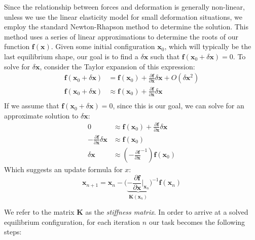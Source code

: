 Since the relationship between forces and deformation is generally
non-linear, unless we use the linear elasticity model for small
deformation situations, we employ the standard Newton-Rhapson method
to determine the solution. This method uses a series of linear
approximations to determine the roots of our function $\mathbf
f(\mathbf x)$. Given some initial configuration
$\mathbf x_0$, which will typically be the last equilibrium shape, our
goal is to find a $\delta \mathbf x$ such that $\mathbf f(\mathbf x_0 + \delta \mathbf
x) = 0$. To solve for $\delta \mathbf x$, consider the Taylor
expansion of this expression:
\begin{equation}
  \label{equ:newtontaylor}
  \begin{split}
    \mathbf f(\mathbf x_0 + \delta \mathbf x) &= \mathbf f(\mathbf x_0) + \frac{ \partial \mathbf f }{\partial \mathbf x}
    \delta \mathbf x + O(\delta \mathbf x^2)\\
    \mathbf f(\mathbf x_0 + \delta \mathbf x) &\approx \mathbf f(\mathbf x_0) + \frac{ \partial \mathbf f }{\partial \mathbf x}
    \delta \mathbf x\\
  \end{split}
\end{equation}
If we assume that $\mathbf f(\mathbf x_0 + \delta \mathbf x) = 0$, since this is our goal, we
can solve for an approximate solution to $\delta \mathbf x$:
\begin{equation}
  \label{equ:newtonupdateder}
  \begin{split}
    0 &\approx \mathbf f(\mathbf x_0) + \frac{ \partial \mathbf f }{\partial \mathbf x}
    \delta \mathbf x\\
    -\frac{ \partial \mathbf f }{\partial \mathbf x} \delta \mathbf x &\approx \mathbf f(\mathbf x_0)\\
    \delta \mathbf x &\approx (-\frac{ \partial \mathbf f }{\partial \mathbf x}^{-1})\mathbf f(\mathbf x_0)
  \end{split}
\end{equation}
Which suggests an update formula for $x$:
\begin{equation}
  \label{equ:newtonupdate}
  \mathbf x_{n+1} = \mathbf x_n - \bigg(\underbrace{-\frac{ \partial \mathbf f }{\partial
      \mathbf x}\bigg\rvert_{\mathbf x_n}}_{\mathbf K(\mathbf x_n)}\bigg)^{-1}\mathbf f(\mathbf x_n)
\end{equation}

We refer to the matrix $\mathbf K$ as the \textit{stiffness
  matrix}. In order to arrive at a solved equilibrium configuration, for
each iteration $n$ our task becomes the following steps:

